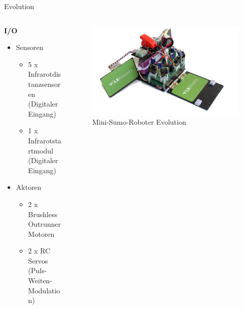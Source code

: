 \documentclass{beamer}
\begin{document}
\begin{frame}{Evolution}
\begin{columns}
	\begin{column}{0.6\textwidth}
\begin{large}\textbf{I/O}\end{large}
\begin{itemize}
	\item Sensoren
	\begin{itemize}
		\item 5 x Infrarotdistanzsensoren (Digitaler Eingang)
		\item 1 x Infrarotstartmodul (Digitaler Eingang)
	\end{itemize}
	\item Aktoren
	\begin{itemize}
		\item 2 x Brushless Outrunner Motoren
		\item 2 x RC Servos (Puls-Weiten-Modulation)
	\end{itemize}
\end{itemize}
	\end{column}
	\begin{column}{0.4\textwidth}
 \begin{figure}[H]
 	\centering
 	\includegraphics[width=1.0\textwidth]{./images/robot-evolution.jpg}
 	\caption{Mini-Sumo-Roboter Evolution}
 \end{figure}
	\end{column}
\end{columns}
\end{frame}
\end{document}
